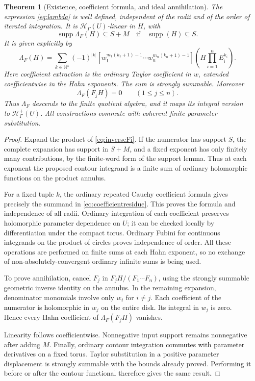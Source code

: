 \documentclass[11pt,oneside]{article}
\numberwithin{equation}{section}
\newtheorem{theorem}{Theorem}[section]
\theoremstyle{definition}
\theoremstyle{remark}\newtheorem{remark}[theorem]{Remark}
\newcommand{\N}{\mathbb N}
\newcommand{\HH}{\mathcal H_{\Gamma}}
\newcommand{\Hp}{\mathcal H^{+}_{\Gamma}}
\newcommand{\supp}{\operatorname{supp}}
\begin{document}
\begin{theorem}[Existence, coefficient formula, and ideal annihilation]\label{thm:residuefunctional}
The expression \eqref{eq:lambda} is well defined, independent of the radii and of the order of iterated integration. It is \(\HH(U)\)-linear in \(H\), with
\[
 \supp\Lambda_F(H)\subseteq S+M
 \quad\text{if}\quad\supp(H)\subseteq S.
\]
It is given explicitly by
\begin{equation}\label{eq:coefficientresidue}
 \Lambda_F(H)=
 \sum_{k\in\N^n}(-1)^{|k|}
 \left[w_1^{m_1(k_1+1)-1}\cdots
       w_n^{m_n(k_n+1)-1}\right]
 \left(H\prod_{i=1}^nE_i^{k_i}\right).
\end{equation}
Here coefficient extraction is the ordinary Taylor coefficient in \(w\), extended coefficientwise in the Hahn exponents. The sum is strongly summable. Moreover
\[
 \Lambda_F(F_jH)=0\qquad(1\leq j\leq n).
\]
Thus \(\Lambda_F\) descends to the finite quotient algebra, and it maps its integral version to \(\Hp(U)\). All constructions commute with coherent finite parameter substitution.
\end{theorem}
\begin{proof}
Expand the product of \eqref{eq:inverseFi}. If the numerator has support \(S\), the complete expansion has support in \(S+M\), and a fixed exponent has only finitely many contributions, by the finite-word form of the support lemma. Thus at each exponent the proposed contour integrand is a finite sum of ordinary holomorphic functions on the product annulus.

For a fixed tuple \(k\), the ordinary repeated Cauchy coefficient formula gives precisely the summand in \eqref{eq:coefficientresidue}. This proves the formula and independence of all radii. Ordinary integration of each coefficient preserves holomorphic parameter dependence on \(U\); it can be checked locally by differentiation under the compact torus. Ordinary Fubini for continuous integrands on the product of circles proves independence of order. All these operations are performed on finite sums at each Hahn exponent, so no exchange of non-absolutely-convergent ordinary infinite sums is being used.

To prove annihilation, cancel \(F_j\) in \(F_jH/(F_1\cdots F_n)\), using the strongly summable geometric inverse identity on the annulus. In the remaining expansion, denominator monomials involve only \(w_i\) for \(i\ne j\). Each coefficient of the numerator is holomorphic in \(w_j\) on the entire disk. Its integral in \(w_j\) is zero. Hence every Hahn coefficient of \(\Lambda_F(F_jH)\) vanishes.

Linearity follows coefficientwise. Nonnegative input support remains nonnegative after adding \(M\). Finally, ordinary contour integration commutes with parameter derivatives on a fixed torus. Taylor substitution in a positive parameter displacement is strongly summable with the bounds already proved. Performing it before or after the contour functional therefore gives the same result.
\end{proof}
\end{document}
